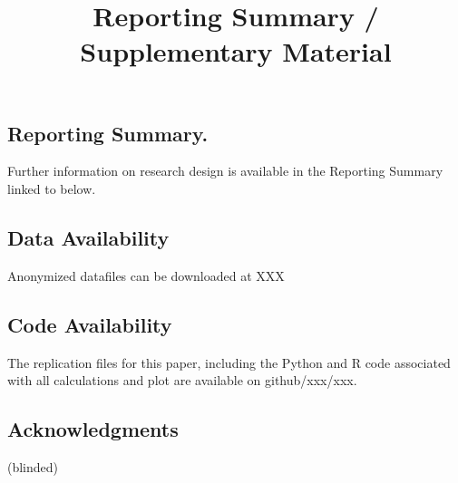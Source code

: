 \documentclass[9pt,a4paper,twocolumn,lineno]{article}
\begin{document}
\subsection*{Reporting Summary.} \small Further information on research design is available in the Reporting Summary linked to below.

\subsection*{Data Availability}
\small Anonymized datafiles can be downloaded at XXX

\subsection*{Code Availability}
\small The replication files for this paper, including the Python and R code associated with all calculations and plot are available on github/xxx/xxx.




\subsection*{Acknowledgments}  \small (blinded)%




\newpage
\appendix
\onecolumn

\title{\Huge Reporting Summary / Supplementary Material}
\end{document}
